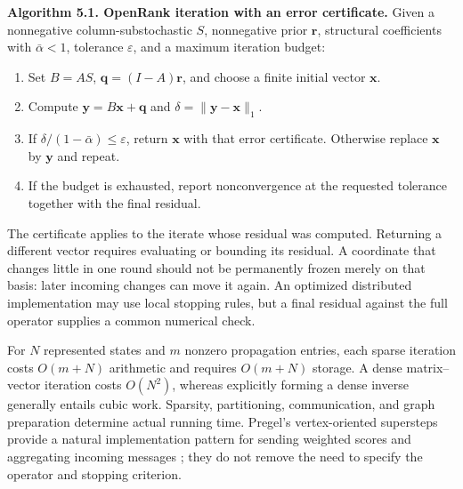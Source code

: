 \begin{definitionbox}
\textbf{Algorithm 5.1. OpenRank iteration with an error certificate.} Given a nonnegative column-substochastic \(S\), nonnegative prior \(\boldsymbol r\), structural coefficients with \(\bar\alpha<1\), tolerance \(\varepsilon\), and a maximum iteration budget:
\begin{enumerate}
\item Set \(B=AS\), \(\boldsymbol q=(I-A)\boldsymbol r\), and choose a finite initial vector \(\boldsymbol x\).
\item Compute \(\boldsymbol y=B\boldsymbol x+\boldsymbol q\) and \(\delta=\lVert\boldsymbol y-\boldsymbol x\rVert_1\).
\item If \(\delta/(1-\bar\alpha)\leq\varepsilon\), return \(\boldsymbol x\) with that error certificate. Otherwise replace \(\boldsymbol x\) by \(\boldsymbol y\) and repeat.
\item If the budget is exhausted, report nonconvergence at the requested tolerance together with the final residual.
\end{enumerate}
\end{definitionbox}

The certificate applies to the iterate whose residual was computed. Returning a different vector requires evaluating or bounding its residual. A coordinate that changes little in one round should not be permanently frozen merely on that basis: later incoming changes can move it again. An optimized distributed implementation may use local stopping rules, but a final residual against the full operator supplies a common numerical check.

For \(N\) represented states and \(m\) nonzero propagation entries, each sparse iteration costs \(O(m+N)\) arithmetic and requires \(O(m+N)\) storage. A dense matrix--vector iteration costs \(O(N^2)\), whereas explicitly forming a dense inverse generally entails cubic work. Sparsity, partitioning, communication, and graph preparation determine actual running time. Pregel's vertex-oriented supersteps provide a natural implementation pattern for sending weighted scores and aggregating incoming messages \citep{malewicz2010}; they do not remove the need to specify the operator and stopping criterion.


